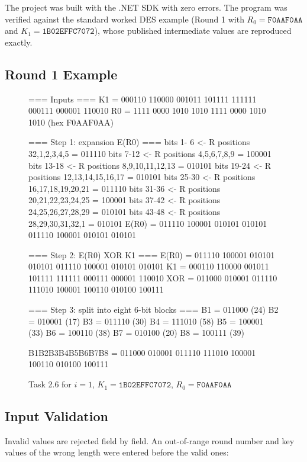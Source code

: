\documentclass[12pt,a4paper]{article}
\begin{document}
The project was built with the .NET SDK with zero errors. The program was verified against the standard worked DES example (Round 1 with $R_0=\texttt{F0AAF0AA}$ and $K_1=\texttt{1B02EFFC7072}$), whose published intermediate values are reproduced exactly.

\subsection{Round 1 Example}

\begin{figure}[H]
\centering
\caption{Task 2.6 for $i=1$, $K_1=\texttt{1B02EFFC7072}$, $R_0=\texttt{F0AAF0AA}$}
\begin{minipage}{0.96\textwidth}
\begin{terminaloutput}
=== Inputs ===
K1 = 000110 110000 001011 101111 111111 000111 000001 110010
R0 = 1111 0000 1010 1010 1111 0000 1010 1010  (hex F0AAF0AA)

=== Step 1: expansion E(R0) ===
  bits  1- 6  <- R positions 32,1,2,3,4,5       = 011110
  bits  7-12  <- R positions 4,5,6,7,8,9        = 100001
  bits 13-18  <- R positions 8,9,10,11,12,13    = 010101
  bits 19-24  <- R positions 12,13,14,15,16,17  = 010101
  bits 25-30  <- R positions 16,17,18,19,20,21  = 011110
  bits 31-36  <- R positions 20,21,22,23,24,25  = 100001
  bits 37-42  <- R positions 24,25,26,27,28,29  = 010101
  bits 43-48  <- R positions 28,29,30,31,32,1   = 010101
E(R0) = 011110 100001 010101 010101 011110 100001 010101 010101

=== Step 2: E(R0) XOR K1 ===
E(R0) = 011110 100001 010101 010101 011110 100001 010101 010101
K1    = 000110 110000 001011 101111 111111 000111 000001 110010
XOR   = 011000 010001 011110 111010 100001 100110 010100 100111

=== Step 3: split into eight 6-bit blocks ===
B1 = 011000 (24)   B2 = 010001 (17)   B3 = 011110 (30)
B4 = 111010 (58)   B5 = 100001 (33)   B6 = 100110 (38)
B7 = 010100 (20)   B8 = 100111 (39)

B1B2B3B4B5B6B7B8 =
011000 010001 011110 111010 100001 100110 010100 100111
\end{terminaloutput}
\end{minipage}
\end{figure}

\subsection{Input Validation}

Invalid values are rejected field by field. An out-of-range round number and key values of the wrong length were entered before the valid ones:
\end{document}
